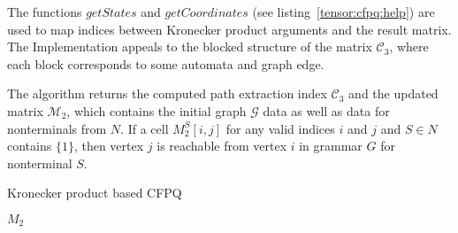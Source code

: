 The functions $getStates$ and $getCoordinates$ (see listing~\ref{tensor:cfpq:help})
are used to map indices between Kronecker product arguments and the result matrix.
The Implementation appeals to the blocked structure of the matrix $\mathcal{C}_3$, 
where each block corresponds to some automata and graph edge.

The algorithm returns the computed path extraction index $\mathcal{C}_3$ and 
the updated matrix $\mathcal{M}_2$, which contains the initial 
graph $\mathcal{G}$ data as well as data for nonterminals from $N$.
If a cell $M_2^S[i,j]$ for any valid indices $i$ and $j$ and $S \in N$ 
contains $\{1\}$, then vertex $j$ is reachable from vertex $i$ in grammar $G$ for 
nonterminal $S$.

\begin{algorithm}[h]
\begin{algorithmic}[1]
\footnotesize
\caption{Kronecker product based CFPQ}
\label{tensor:cfpq}
            \EndFor
        \EndFor
    \EndFor
                \EndFor
            \EndIf
        \EndFor
    \EndWhile
\State \Return $M_2$
\EndFunction
\end{algorithmic}
\end{algorithm}


